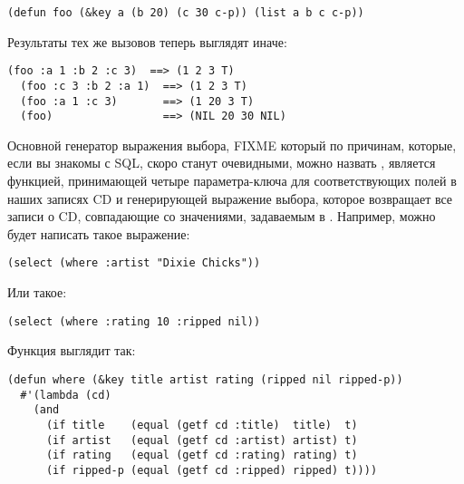 \begin{lstlisting}
(defun foo (&key a (b 20) (c 30 c-p)) (list a b c c-p))
\end{lstlisting}

Результаты тех же вызовов теперь выглядят иначе:

\begin{lstlisting}[style=lisprepl]
  (foo :a 1 :b 2 :c 3)  ==> (1 2 3 T)
  (foo :c 3 :b 2 :a 1)  ==> (1 2 3 T)
  (foo :a 1 :c 3)       ==> (1 20 3 T)
  (foo)                 ==> (NIL 20 30 NIL)
\end{lstlisting}

Основной генератор выражения выбора, FIXME который по причинам, которые, если вы знакомы с
SQL, скоро станут очевидными, можно назвать , является функцией, принимающей
четыре параметра-ключа для соответствующих полей в наших записях CD и генерирующей
выражение выбора, которое возвращает все записи о CD, совпадающие со значениями,
задаваемым в . Например, можно будет написать такое выражение:

\begin{lstlisting}
(select (where :artist "Dixie Chicks"))
\end{lstlisting}

Или такое:

\begin{lstlisting}
(select (where :rating 10 :ripped nil))
\end{lstlisting}

Функция выглядит так:

\begin{lstlisting}
(defun where (&key title artist rating (ripped nil ripped-p))
  #'(lambda (cd)
    (and
      (if title    (equal (getf cd :title)  title)  t)
      (if artist   (equal (getf cd :artist) artist) t)
      (if rating   (equal (getf cd :rating) rating) t)
      (if ripped-p (equal (getf cd :ripped) ripped) t))))
\end{lstlisting}

